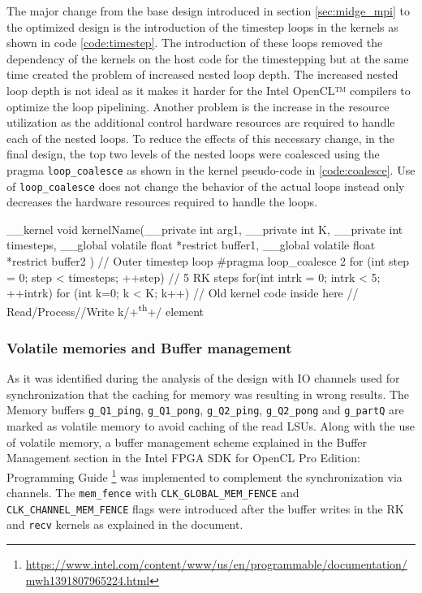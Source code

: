 The major change from the base design introduced in section \ref{sec:midge_mpi} to the
optimized design is the introduction of the timestep loops in the kernels as shown in
code \ref{code:timestep}. The introduction of these loops removed the dependency of the kernels
on the host code for the timestepping but at the same time created the problem of increased
nested loop depth. The increased nested loop depth is not ideal as it makes it harder
for the Intel OpenCL™ compilers to optimize the loop pipelining. Another problem is the
increase in the resource utilization as the additional control hardware resources are
required to handle each of the nested loops. To reduce the effects of this necessary
change, in the final design, the top two levels of the nested loops were coalesced
using the pragma \texttt{loop\_coalesce} as shown in the kernel pseudo-code in \ref{code:coalesce}.
Use of \texttt{loop\_coalesce} does not change the behavior of the actual loops instead
only decreases the hardware resources required to handle the loops.
\begin{CppCode}[caption=Loop coalescing used for additional timestep loops in FPGA only design, frame=tlrb, label=code:coalesce]
__kernel void kernelName(__private int arg1,
                            __private int K,
                            __private int timesteps,
                            __global volatile float  *restrict buffer1,
                            __global volatile float  *restrict buffer2
                        )
{
    // Outer timestep loop
    #pragma loop_coalesce 2
    for (int step = 0; step < timesteps; ++step)
    {
        // 5 RK steps
        for(int intrk = 0; intrk < 5; ++intrk)
        {
            for (int k=0; k < K; k++)
            {
                // Old kernel code inside here
                // Read/Process//Write k/+\textsuperscript{th}+/ element
            }
        }
    }
}
\end{CppCode}

\subsubsection*{Volatile memories and Buffer management}

As it was identified during the analysis of the design with IO channels used
for synchronization \label{sec:sync_iochan} that the caching for memory was resulting
in wrong results. The Memory buffers \texttt{g\_Q1\_ping}, \texttt{g\_Q1\_pong}, \texttt{g\_Q2\_ping},
\texttt{g\_Q2\_pong} and \texttt{g\_partQ} are marked as volatile memory to avoid
caching of the read \ac{LSU}s. Along with the use of volatile memory, a buffer management
scheme explained in the Buffer Management section in the Intel FPGA SDK for OpenCL Pro Edition: Programming Guide
\footnote{\url{https://www.intel.com/content/www/us/en/programmable/documentation/mwh1391807965224.html}}
was implemented to complement the synchronization via channels. The \texttt{mem\_fence}
with \texttt{CLK\_GLOBAL\_MEM\_FENCE} and \texttt{CLK\_CHANNEL\_MEM\_FENCE} flags were introduced
after the buffer writes in the RK and \texttt{recv} kernels as explained in the document.

